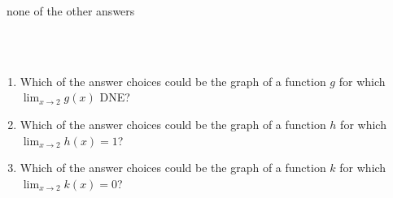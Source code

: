 \documentclass[10pt]{article}
\begin{document}
\,\hfill {} none of the other answers \hfill\,\\

\


\

\begin{enumerate}


\item[(a)] Which of the answer choices could be the graph of a function $g$ for which $\displaystyle\lim_{x\to2} g(x)$ DNE? \hfill {}

\vfill

\item[(b)] Which of the answer choices could be the graph of a function $h$ for which $\displaystyle\lim_{x\to2} h(x)=1$? \hfill{}

\vfill

\item[(c)] Which of the answer choices could be the graph of a function $k$ for which $\displaystyle\lim_{x\to2} k(x)=0$?\hfill {}

\vfill

\end{enumerate}
\end{document}
